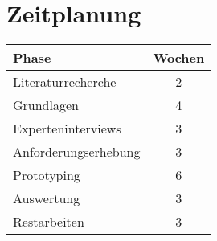 \section{Zeitplanung}
\begin{centering}
	\begin{tabular}{|l|c|}
		\hline
		Phase & Wochen \\
		\hline
		Literaturrecherche & 2 \\
		\hline
		Grundlagen & 4 \\
		\hline
		Experteninterviews & 3 \\
		\hline
		Anforderungserhebung & 3 \\
		\hline
		Prototyping & 6 \\
		\hline
		Auswertung & 3 \\
		\hline
		Restarbeiten & 3 \\
		\hline
	\end{tabular}
\end{centering}
\newpage
